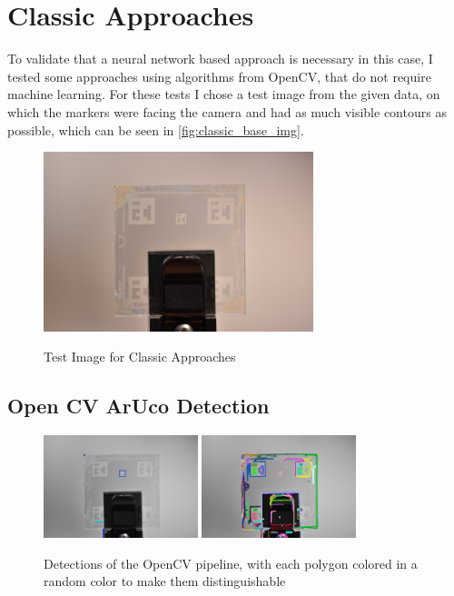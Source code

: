 \documentclass[10pt]{book}
\begin{document}
\section{Classic Approaches}

To validate that a neural network based approach is necessary in this case, I tested some approaches using algorithms from \ac{OpenCV}, that do not require machine learning. For these tests I chose a test image from the given data, on which the markers were facing the camera and had as much visible contours as possible, which can be seen in \autoref{fig:classic_base_img}. 

\begin{figure}
  \caption{Test Image for Classic Approaches}
  \includegraphics[width=0.7\textwidth]{image/classic_base_img}
  \label{fig:classic_base_img}
\end{figure}

\subsection{Open CV ArUco Detection}

\begin{figure}
  \centering
     {\includegraphics[width=0.4\textwidth]{image/classic_base_img_opencv_det_small}}
     {\includegraphics[width=0.4\textwidth]{image/classic_base_img_opencv_det_all}}
  \caption{Detections of the \ac{OpenCV} pipeline, with each polygon colored in a random color to make them distinguishable}
  \label{fig:classic_base_img_opencv}
\end{figure}
\end{document}
